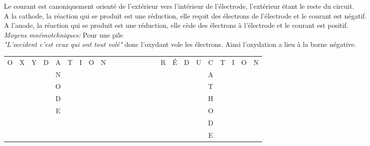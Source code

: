 \documentclass[a4paper]{article}
\begin{document}
\pagestyle{fancy}
\fancyhf{}
\setlength{\headheight}{15pt}

\begin{center}
	\large{}
\end{center}


Le courant est canoniquement orienté de l'extérieur vers l'intérieur de l'électrode, l'extérieur étant le reste du circuit.\\
A la cathode, la réaction qui se produit est une réduction, elle reçoit des électrons de l'électrode et le courant est négatif.\\
A l'anode, la réaction qui se produit est une réduction, elle cède des électrons à l'électrode et le courant est positif.\\
\emph{Moyens mnémotchniques: } Pour une pile\\
\emph{"L'occident c'est ceux qui ont tout volé"} donc l'oxydant vole les électrons. Ainsi l'oxydation a lieu à la borne négative.\\
\begin{table}[h!]
\center
\begin{tabular}{*{25}{c}}
O&X&Y&D&A&T&I&O&N&&&&&&&&R&É&D&U&C&T&I&O&N\\
&&&&N&&&&&&&&&&&&&&&&A\\
&&&&O&&&&&&&&&&&&&&&&T\\
&&&&D&&&&&&&&&&&&&&&&H\\
&&&&E&&&&&&&&&&&&&&&&O\\
&&&&&&&&&&&&&&&&&&&&D\\
&&&&&&&&&&&&&&&&&&&&E

\end{tabular}
\end{table}
\end{document}
